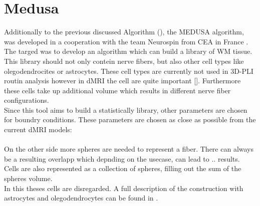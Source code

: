 \section{Medusa}
% 
Additionally to the previous discussed Algorithm (\dummy), the \ac{MEDUSA} algorithm, was developed in a cooperation with the team Neurospin from \ac{CEA} in France \cite{Ginsburger2019}. The targed was to develop an algorithm which can build a library of \ac{WM} tissue. This library should not only contein nerve fibers, but also other cell types like olegodendrocites or astrocytes. These cell types are currently not used in \ac{3D-PLI} routin analysis however in \ac{dMRI} the cell are quite important [\dummy]. Furthermore these cells take up additional volume which results in different nerve fiber configurations.\\
% 
Since this tool aims to build a statistically library, other parameters are chosen for boundry conditions. These parameters are chosen as close as possible from the current \ac{dMRI} models:
\dummy\\
\dummy\\
% 
% 
On the other side more spheres  are needed to represent a fiber. There can always be a resulting overlapp which depnding on the usecase, can lead to .. results.\\
% 
Cells are also represented as a collection of spheres, filling out the sum of the spheres volume. \\
%
In this theses cells are disregarded. A full description of the construction with astrocytes and olegodendrocytes can be found in \cite{Ginsburger2019}.
% 
